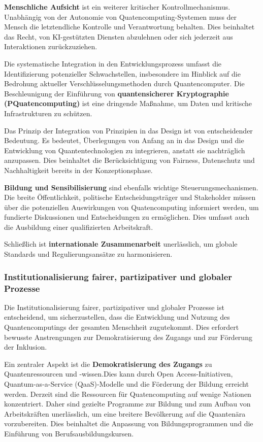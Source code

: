 \textbf{Menschliche Aufsicht} ist ein weiterer kritischer Kontrollmechanismus. Unabhängig von der Autonomie von Quatencomputing-Systemen muss der Mensch die letztendliche Kontrolle und Verantwortung behalten. Dies beinhaltet das Recht, von KI-gestützten Diensten abzulehnen oder sich jederzeit aus Interaktionen zurückzuziehen.\cite{noauthor_ethical_nodate} 

Die systematische Integration in den Entwicklungsprozess umfasst die Identifizierung potenzieller Schwachstellen, insbesondere im Hinblick auf die Bedrohung aktueller Verschlüsselungsmethoden durch Quantencomputer.\cite{noauthor_quantum_nodate-7} Die Beschleunigung der Einführung von\textbf{ quantensicherer Kryptographie (PQuatencomputing) }ist eine dringende Maßnahme, um Daten und kritische Infrastrukturen zu schützen.

Das Prinzip der Integration von Prinzipien in das Design ist von entscheidender Bedeutung. Es bedeutet, Überlegungen von Anfang an in das Design und die Entwicklung von Quantentechnologien zu integrieren, anstatt sie nachträglich anzupassen. Dies beinhaltet die Berücksichtigung von Fairness, Datenschutz und Nachhaltigkeit bereits in der Konzeptionsphase. \cite{arrow_holistic_2023}\cite{noauthor_ethics_nodate}

\textbf{Bildung und Sensibilisierung} sind ebenfalls wichtige Steuerungsmechanismen.\cite{noauthor_ethics_nodate-1} Die breite Öffentlichkeit, politische Entscheidungsträger und Stakeholder müssen über die potenziellen Auswirkungen von Quatencomputing informiert werden, um fundierte Diskussionen und Entscheidungen zu ermöglichen. Dies umfasst auch die Ausbildung einer qualifizierten Arbeitskraft.\cite{noauthor_what_nodate}

Schließlich ist \textbf{internationale Zusammenarbeit} unerlässlich, um globale Standards und Regulierungsansätze zu harmonisieren.\cite{noauthor_quantum_nodate-7}

\subsubsection{\textbf{Institutionalisierung fairer, partizipativer und globaler Prozesse}}
Die Institutionalisierung fairer, partizipativer und globaler Prozesse ist entscheidend, um sicherzustellen, dass die Entwicklung und Nutzung des Quantencomputings der gesamten Menschheit zugutekommt. Dies erfordert bewusste Anstrengungen zur Demokratisierung des Zugangs und zur Förderung der Inklusion.

Ein zentraler Aspekt ist die \textbf{Demokratisierung des Zugangs} zu Quantenressourcen und -wissen.Dies kann durch Open Access-Initiativen, Quantum-as-a-Service (QaaS)-Modelle und die Förderung der Bildung erreicht werden.\cite{bond_quantum_2024} Derzeit sind die Ressourcen für Quatencomputing auf wenige Nationen konzentriert.\cite{noauthor_quantum_nodate-2} Daher sind gezielte Programme zur Bildung und zum Aufbau von Arbeitskräften unerlässlich, um eine breitere Bevölkerung auf die Quantenära vorzubereiten.\cite{noauthor_what_nodate} Dies beinhaltet die Anpassung von Bildungsprogrammen und die Einführung von Berufsausbildungskursen.\cite{noauthor_policymakers_2025}

